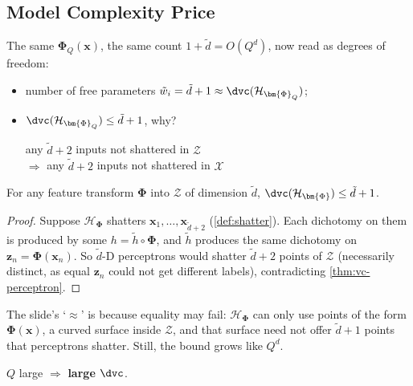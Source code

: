 \subsection{Model Complexity Price}

The same \(\bm{\Phi}_Q(\bm{x})\), the same count \(1 + \tilde{d} = O(Q^d)\),
now read as degrees of freedom:
\begin{itemize}
    \item number of free parameters \(\tilde{w}_i = \tilde{d} + 1 \approx
        \dvc(\mathcal{H}_{\bm{\Phi}_Q})\);
    \item \(\dvc(\mathcal{H}_{\bm{\Phi}_Q}) \le \tilde{d} + 1\), why?
        \begin{center}
            any \(\tilde{d} + 2\) inputs not shattered in \(\mathcal{Z}\)\\
            \(\Longrightarrow\) any \(\tilde{d} + 2\) inputs not shattered in
            \(\mathcal{X}\)
        \end{center}
\end{itemize}

\begin{proposition}\label{prop:vc-transform}
    For any feature transform \(\bm{\Phi}\) into \(\mathcal{Z}\) of dimension
    \(\tilde{d}\), \(\dvc(\mathcal{H}_{\bm{\Phi}}) \le \tilde{d} + 1\).
\end{proposition}

\begin{proof}
    Suppose \(\mathcal{H}_{\bm{\Phi}}\) shatters \(\bm{x}_1, \dots,
    \bm{x}_{\tilde{d}+2}\) (\autoref{def:shatter}). Each dichotomy on them is
    produced by some \(h = \tilde{h} \circ \bm{\Phi}\), and \(\tilde{h}\)
    produces the same dichotomy on \(\bm{z}_n = \bm{\Phi}(\bm{x}_n)\). So
    \(\tilde{d}\)-D perceptrons would shatter \(\tilde{d} + 2\) points of
    \(\mathcal{Z}\) (necessarily distinct, as equal \(\bm{z}_n\) could not get
    different labels), contradicting \autoref{thm:vc-perceptron}.
\end{proof}

The slide's `\(\approx\)' is because equality may fail: \(\mathcal{H}_{\bm{\Phi}}\)
can only use points of the form \(\bm{\Phi}(\bm{x})\), a curved surface inside
\(\mathcal{Z}\), and that surface need not offer \(\tilde{d} + 1\) points that
perceptrons shatter. Still, the bound grows like \(Q^d\).

\begin{moral}
    \(Q\) large \(\Longrightarrow\) \textbf{large \(\dvc\)}.
\end{moral}

